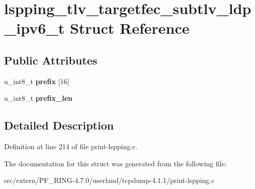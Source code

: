 \hypertarget{structlspping__tlv__targetfec__subtlv__ldp__ipv6__t}{
\section{lspping\_\-tlv\_\-targetfec\_\-subtlv\_\-ldp\_\-ipv6\_\-t Struct Reference}
\label{structlspping__tlv__targetfec__subtlv__ldp__ipv6__t}
}
\subsection*{Public Attributes}
\begin{DoxyCompactItemize}
\item 
\hypertarget{structlspping__tlv__targetfec__subtlv__ldp__ipv6__t_a7e115ba8d9829c728a124e739303a558}{
u\_\-int8\_\-t {\bfseries prefix} \mbox{[}16\mbox{]}}
\label{structlspping__tlv__targetfec__subtlv__ldp__ipv6__t_a7e115ba8d9829c728a124e739303a558}

\item 
\hypertarget{structlspping__tlv__targetfec__subtlv__ldp__ipv6__t_acb38c3b5f90fc484e238a63e21bb13c4}{
u\_\-int8\_\-t {\bfseries prefix\_\-len}}
\label{structlspping__tlv__targetfec__subtlv__ldp__ipv6__t_acb38c3b5f90fc484e238a63e21bb13c4}

\end{DoxyCompactItemize}


\subsection{Detailed Description}


Definition at line 214 of file print-\/lspping.c.



The documentation for this struct was generated from the following file:\begin{DoxyCompactItemize}
\item 
src/extern/PF\_\-RING-\/4.7.0/userland/tcpdump-\/4.1.1/print-\/lspping.c\end{DoxyCompactItemize}
